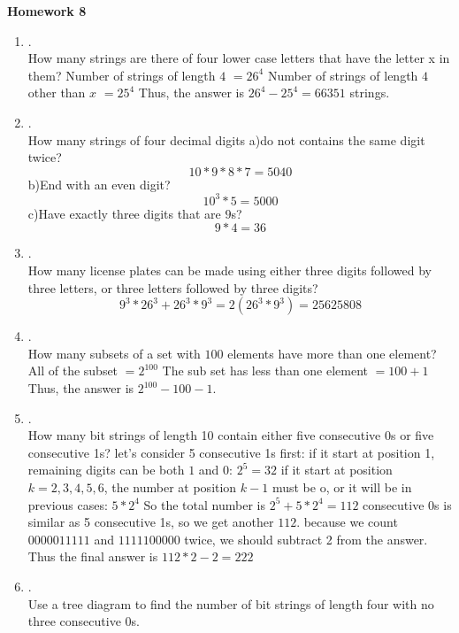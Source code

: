 \documentclass{article}
\theoremstyle{definition}
\theoremstyle{plain}
\begin{document}
\begin{center} \bf \LARGE Homework 8\\
\end{center}


\begin {enumerate}[itemindent=30pt,label=\bf Exercise {\arabic*}:]
\item .\\
How many strings are there of four lower case letters that have the letter x in them?
\subitem Number of strings of length $4$ $=26^4$
\subitem Number of strings of length $4$ other than $x$ $=25^4$
\subitem Thus, the answer is $26^4 - 25^4= 66351$ strings.
\item. \\How many strings of four decimal digits
\subitem a)do not contains the same digit twice?$$10*9*8*7 = 5040 $$ 
\subitem b)End with an even digit?$$ 10^3*5 = 5000$$
\subitem c)Have exactly three digits that are $9$s?$$9*4 = 36$$
\item .\\How many license plates can be made using either three digits followed by three letters, or three letters followed by three digits?
$$ 9^3*26^3 + 26^3*9^3 = 2(26^3*9^3) = 25625808$$
\item .\\How many subsets of a set with $100$ elements have more than one element?
\subitem All of the subset $=2^{100}$
\subitem The sub set has less than one element $=100+1$
\subitem Thus, the answer is $2^{100} - 100 -1$.
\item .\\How many bit strings of length 10 contain either five consecutive 0s or five consecutive 1s?
\subitem let's consider 5 consecutive 1s first:
\subitem if it start at position 1, remaining digits can be both $1$ and $0$: $2^5 = 32$
\subitem if it start at position $k = 2,3,4,5,6$, the number at position $k-1$ must be o, or it will be in previous cases: $5*2^4$
\subitem So the total number is $2^5 + 5*2^4 = 112$
 consecutive 0s is similar as 5 consecutive 1s, so we get another $112$.
\subitem because we count $0000011111$ and $1111100000$ twice, we should subtract 2 from the answer.
\subitem Thus the final answer is $112*2 -2 = 222$
\newpage
\item. \\ Use a tree diagram to find the number of bit strings of length four with no three consecutive $0$s.
\begin{center}
\begin{tikzpicture}[scale = 1.2]

\end{tikzpicture}
\end{center}
\end{enumerate}
\end{document}
